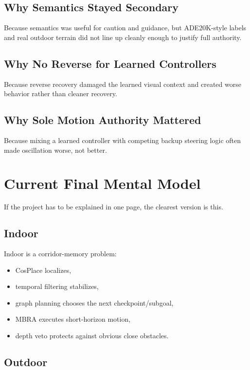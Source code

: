 \documentclass[11pt]{article}
\begin{document}
\subsection{Why Semantics Stayed Secondary}

Because semantics was useful for caution and guidance, but ADE20K-style labels and
real outdoor terrain did not line up cleanly enough to justify full authority.

\subsection{Why No Reverse for Learned Controllers}

Because reverse recovery damaged the learned visual context and created worse
behavior rather than cleaner recovery.

\subsection{Why Sole Motion Authority Mattered}

Because mixing a learned controller with competing backup steering logic often made
oscillation worse, not better.

\section{Current Final Mental Model}

If the project has to be explained in one page, the clearest version is this.

\subsection{Indoor}

Indoor is a corridor-memory problem:

\begin{itemize}[nosep]
  \item CosPlace localizes,
  \item temporal filtering stabilizes,
  \item graph planning chooses the next checkpoint/subgoal,
  \item MBRA executes short-horizon motion,
  \item depth veto protects against obvious close obstacles.
\end{itemize}

\subsection{Outdoor}
\end{document}
